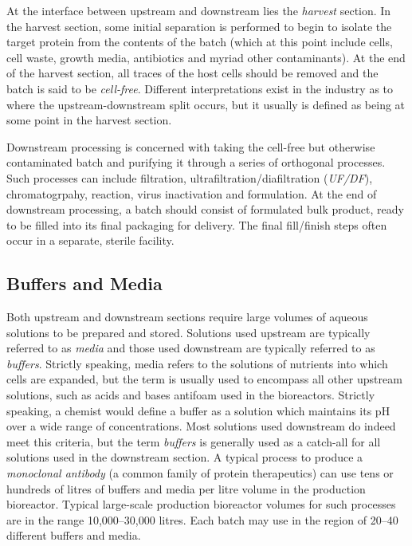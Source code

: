 At the interface between upstream and downstream lies the \emph{harvest}
section. In the harvest section, some initial separation is performed to begin
to isolate the target protein from the contents of the batch (which at this
point include cells, cell waste, growth media, antibiotics and myriad other
contaminants).  At the end of the harvest section, all traces of the host cells
should be removed and the batch is said to be \emph{cell-free}.  Different
interpretations exist in the industry as to where the upstream-downstream split
occurs, but it usually is defined as being at some point in the harvest section.

Downstream processing is concerned with taking the cell-free but otherwise 
contaminated batch and purifying it through a series of orthogonal processes.
Such processes can include filtration, ultrafiltration/diafiltration 
(\emph{UF/DF}), chromatogrpahy, reaction, virus inactivation and formulation.
At the end of downstream processing, a batch should consist of formulated bulk
product, ready to be filled into its final packaging for delivery. The final 
fill/finish steps often occur in a separate, sterile facility.

\subsection{Buffers and Media}\label{SS.buffmed}

Both upstream and downstream sections require large volumes of aqueous solutions
to be prepared and stored.  Solutions used upstream are typically referred to as
\emph{media} and those used downstream are typically referred to as
\emph{buffers}.  Strictly speaking, media refers to the solutions of nutrients
into which cells are expanded, but the term is usually used to encompass all
other upstream solutions, such as acids and bases antifoam used in the
bioreactors.  Strictly speaking, a chemist would define a buffer as a solution
which maintains its pH over a wide range of concentrations.  Most solutions used
downstream do indeed meet this criteria, but the term \emph{buffers} is
generally used as a catch-all for all solutions used in the downstream section.
A typical process to produce a \emph{monoclonal antibody} (a common family of 
protein therapeutics) can use tens or hundreds of litres of buffers and media 
per litre volume in the production bioreactor.  Typical large-scale production
bioreactor volumes for such processes are in the range 10,000--30,000 litres.
Each batch may use in the region of 20--40 different buffers and media.

